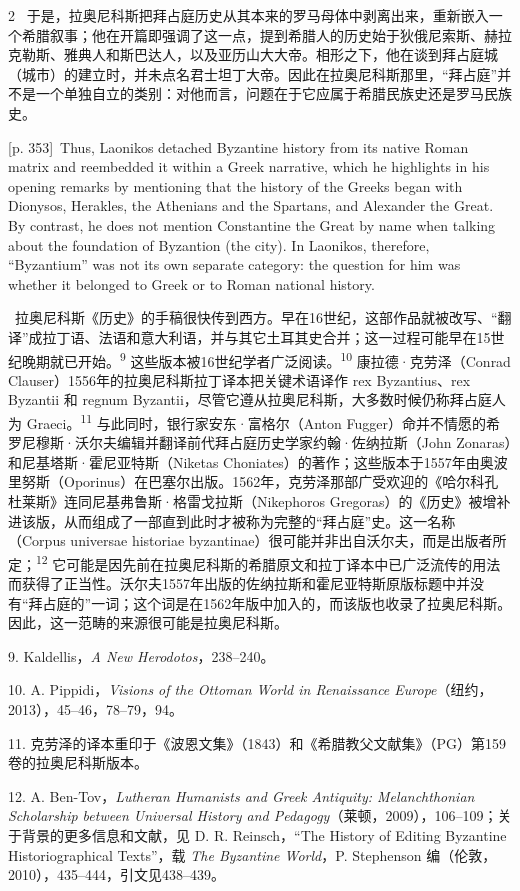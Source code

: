 \documentclass[10pt,a4paper]{article}
\begin{document}
\begin{paracol}{2}
\switchcolumn*
{\scriptsize\color{gray}[p. 353]}\ 于是，拉奥尼科斯把拜占庭历史从其本来的罗马母体中剥离出来，重新嵌入一个希腊叙事；他在开篇即强调了这一点，提到希腊人的历史始于狄俄尼索斯、赫拉克勒斯、雅典人和斯巴达人，以及亚历山大大帝。相形之下，他在谈到拜占庭城（城市）的建立时，并未点名君士坦丁大帝。因此在拉奥尼科斯那里，“拜占庭”并不是一个单独自立的类别：对他而言，问题在于它应属于希腊民族史还是罗马民族史。\par
\switchcolumn
{\scriptsize\color{gray}[p. 353]}\ Thus, Laonikos detached Byzantine history from its native Roman matrix and reembedded it within a Greek narrative, which he highlights in his opening remarks by mentioning that the history of the Greeks began with Dionysos, Herakles, the Athenians and the Spartans, and Alexander the Great. By contrast, he does not mention Constantine the Great by name when talking about the foundation of Byzantion (the city). In Laonikos, therefore, “Byzantium” was not its own separate category: the question for him was whether it belonged to Greek or to Roman national history.\par
\switchcolumn*
{\scriptsize\color{gray}[p. 353–354]}\ 拉奥尼科斯《历史》的手稿很快传到西方。早在16世纪，这部作品就被改写、“翻译”成拉丁语、法语和意大利语，并与其它土耳其史合并；这一过程可能早在15世纪晚期就已开始。\nobreak\textsuperscript{9} 这些版本被16世纪学者广泛阅读。\nobreak\textsuperscript{10} 康拉德·克劳泽（Conrad Clauser）1556年的拉奥尼科斯拉丁译本把关键术语译作 rex Byzantius、rex Byzantii 和 regnum Byzantii，尽管它遵从拉奥尼科斯，大多数时候仍称拜占庭人为 Graeci。\nobreak\textsuperscript{11} 与此同时，银行家安东·富格尔（Anton Fugger）命并不情愿的希罗尼穆斯·沃尔夫编辑并翻译前代拜占庭历史学家约翰·佐纳拉斯（John Zonaras）和尼基塔斯·霍尼亚特斯（Niketas Choniates）的著作；这些版本于1557年由奥波里努斯（Oporinus）在巴塞尔出版。1562年，克劳泽那部广受欢迎的《哈尔科孔杜莱斯》连同尼基弗鲁斯·格雷戈拉斯（Nikephoros Gregoras）的《历史》被增补进该版，从而组成了一部直到此时才被称为完整的“拜占庭”史。这一名称（Corpus universae historiae byzantinae）很可能并非出自沃尔夫，而是出版者所定；\nobreak\textsuperscript{12} 它可能是因先前在拉奥尼科斯的希腊原文和拉丁译本中已广泛流传的用法而获得了正当性。沃尔夫1557年出版的佐纳拉斯和霍尼亚特斯原版标题中并没有“拜占庭的”一词；这个词是在1562年版中加入的，而该版也收录了拉奥尼科斯。因此，这一范畴的来源很可能是拉奥尼科斯。\par{\small 9. Kaldellis，\textit{A New Herodotos}，238–240。\par}{\small 10. A. Pippidi，\textit{Visions of the Ottoman World in Renaissance Europe}（纽约，2013），45–46，78–79，94。\par}{\small 11. 克劳泽的译本重印于《波恩文集》（1843）和《希腊教父文献集》（PG）第159卷的拉奥尼科斯版本。\par}{\small 12. A. Ben-Tov，\textit{Lutheran Humanists and Greek Antiquity: Melanchthonian Scholarship between Universal History and Pedagogy}（莱顿，2009），106–109；关于背景的更多信息和文献，见 D. R. Reinsch，“The History of Editing Byzantine Historiographical Texts”，载 \textit{The Byzantine World}，P. Stephenson 编（伦敦，2010），435–444，引文见438–439。\par}

\end{paracol}
\end{document}
